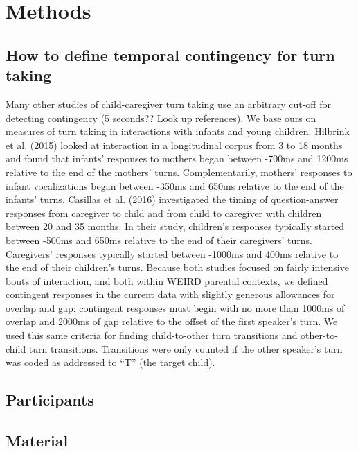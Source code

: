 \documentclass[man]{apa6}
\theoremstyle{definition}
\theoremstyle{definition}
\theoremstyle{definition}
\theoremstyle{remark}
\begin{document}
\section{Methods}\label{methods}

\subsection{How to define temporal contingency for turn
taking}\label{how-to-define-temporal-contingency-for-turn-taking}

Many other studies of child-caregiver turn taking use an arbitrary
cut-off for detecting contingency (5 seconds?? Look up references). We
base ours on measures of turn taking in interactions with infants and
young children. Hilbrink et al. (2015) looked at interaction in a
longitudinal corpus from 3 to 18 months and found that infants'
responses to mothers began between -700ms and 1200ms relative to the end
of the mothers' turns. Complementarily, mothers' responses to infant
vocalizations began between -350ms and 650ms relative to the end of the
infants' turns. Casillas et al. (2016) investigated the timing of
question-answer responses from caregiver to child and from child to
caregiver with children between 20 and 35 months. In their study,
children's responses typically started between -500ms and 650ms relative
to the end of their caregivers' turns. Caregivers' responses typically
started between -1000ms and 400ms relative to the end of their
children's turns. Because both studies focused on fairly intensive bouts
of interaction, and both within WEIRD parental contexts, we defined
contingent responses in the current data with slightly generous
allowances for overlap and gap: contingent responses must begin with no
more than 1000ms of overlap and 2000ms of gap relative to the offset of
the first speaker's turn. We used this same criteria for finding
child-to-other turn transitions and other-to-child turn transitions.
Transitions were only counted if the other speaker's turn was coded as
addressed to \enquote{T} (the target child).

\subsection{Participants}\label{participants}

\subsection{Material}\label{material}
\end{document}
